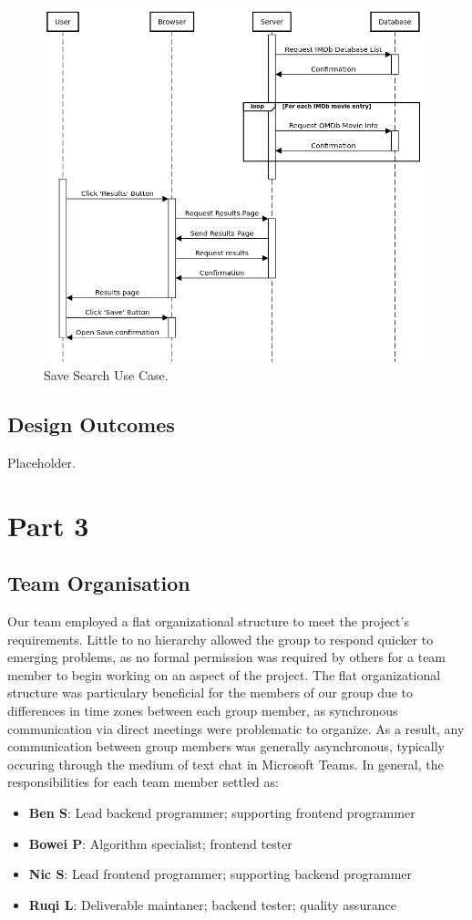 \documentclass{article}
\begin{document}
\begin{figure}[H]
\includegraphics[width=\columnwidth]{res/sequence_diagram4.png}
\caption{Save Search Use Case.}
\end{figure}
\newpage
\subsection{Design Outcomes}
Placeholder.

\section{Part 3}
\subsection{Team Organisation}
Our team employed a flat organizational structure to meet the project's
requirements. Little to no hierarchy allowed the group to respond quicker
to emerging problems, as no formal permission was required by others for
a team member to begin working on an aspect of the project. The flat
organizational structure was particulary beneficial for the members of our
group due to differences in time zones between each group member, as
synchronous communication via direct meetings were problematic to organize.
As a result, any communication between group members was generally
asynchronous, typically occuring through the medium of text chat in Microsoft
Teams. In general, the responsibilities for each team member settled as:
\begin{itemize}
\item \textbf{Ben S}: Lead backend programmer; supporting frontend programmer
\item \textbf{Bowei P}: Algorithm specialist; frontend tester
\item \textbf{Nic S}: Lead frontend programmer; supporting backend programmer
\item \textbf{Ruqi L}: Deliverable maintaner; backend tester; quality
assurance
\end{itemize}
\end{document}
